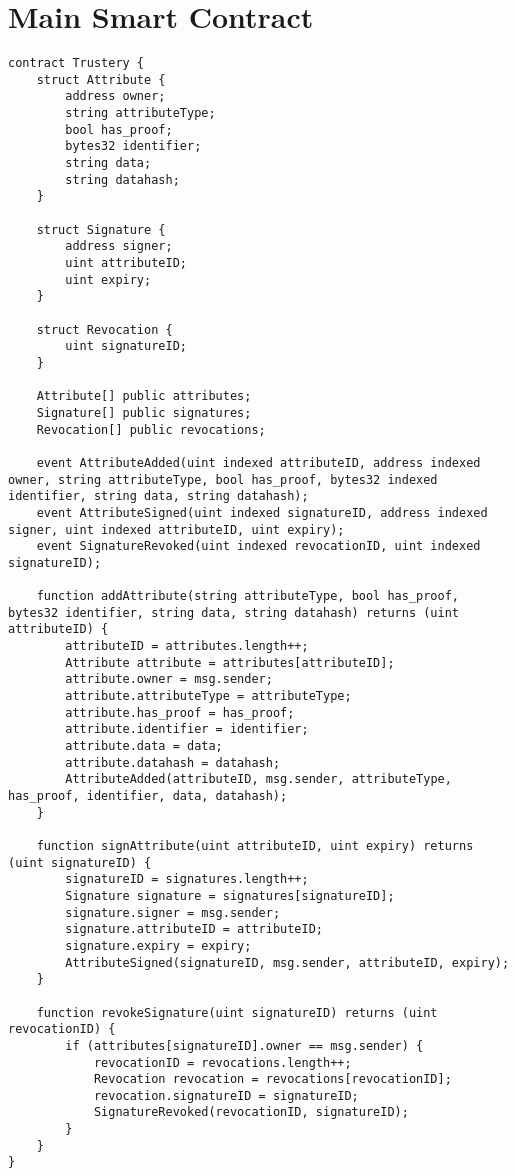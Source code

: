 \documentclass[12pt]{report}
\begin{document}
	\section{Main Smart Contract}
	\begin{lstlisting}
contract Trustery {
    struct Attribute {
        address owner;
        string attributeType;
        bool has_proof;
        bytes32 identifier;
        string data;
        string datahash;
    }

    struct Signature {
        address signer;
        uint attributeID;
        uint expiry;
    }

    struct Revocation {
        uint signatureID;
    }

    Attribute[] public attributes;
    Signature[] public signatures;
    Revocation[] public revocations;

    event AttributeAdded(uint indexed attributeID, address indexed owner, string attributeType, bool has_proof, bytes32 indexed identifier, string data, string datahash);
    event AttributeSigned(uint indexed signatureID, address indexed signer, uint indexed attributeID, uint expiry);
    event SignatureRevoked(uint indexed revocationID, uint indexed signatureID);

    function addAttribute(string attributeType, bool has_proof, bytes32 identifier, string data, string datahash) returns (uint attributeID) {
        attributeID = attributes.length++;
        Attribute attribute = attributes[attributeID];
        attribute.owner = msg.sender;
        attribute.attributeType = attributeType;
        attribute.has_proof = has_proof;
        attribute.identifier = identifier;
        attribute.data = data;
        attribute.datahash = datahash;
        AttributeAdded(attributeID, msg.sender, attributeType, has_proof, identifier, data, datahash);
    }

    function signAttribute(uint attributeID, uint expiry) returns (uint signatureID) {
        signatureID = signatures.length++;
        Signature signature = signatures[signatureID];
        signature.signer = msg.sender;
        signature.attributeID = attributeID;
        signature.expiry = expiry;
        AttributeSigned(signatureID, msg.sender, attributeID, expiry);
    }

    function revokeSignature(uint signatureID) returns (uint revocationID) {
        if (attributes[signatureID].owner == msg.sender) {
            revocationID = revocations.length++;
            Revocation revocation = revocations[revocationID];
            revocation.signatureID = signatureID;
            SignatureRevoked(revocationID, signatureID);
        }
    }
}
	\end{lstlisting}
\end{document}
